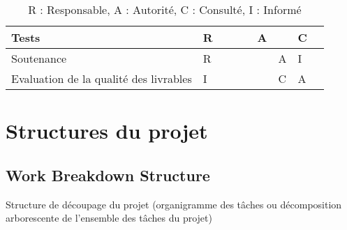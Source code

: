 \documentclass{article}
\begin{document}
\begin{table}[h]
\begin{tabular}{|l|l|l|l|l|l|l|l|l|}
Tests                                  & R   &                                                         &                                                         &                                                            & A         &     & C                                                        &                                                           \\ \hline
Soutenance                             & R   &                                                         &                                                         &                                                            &           & A   & I                                                        &                                                           \\ \hline
Evaluation de la qualité des livrables & I   &                                                         &                                                         &                                                            &           & C   & A                                                        &                                                           \\ \hline
\end{tabular}
\caption{R : Responsable, A : Autorité, C : Consulté, I : Informé}
\end{table}

\section{Structures du projet}
\subsection{Work Breakdown Structure}
Structure de découpage du projet (organigramme des tâches ou décomposition arborescente de l'ensemble des tâches du projet)

\end{document}
